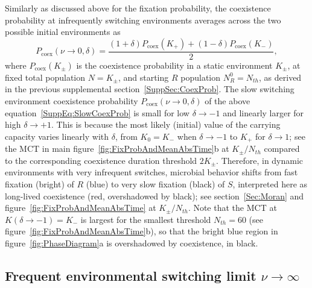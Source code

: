 \documentclass{article}
\begin{document}
Similarly as discussed above for the fixation probability, the coexistence probability at infrequently switching environments averages across the two possible initial environments as
\begin{equation}
    P_{\text{coex}}\left(\nu\rightarrow0,\delta\right) =\frac{(1+\delta)P_{\text{coex}}\left(K_+\right)+(1-\delta)P_{\text{coex}}\left(K_-\right)}{2},
\label{SuppEq:SlowCoexProb}
\end{equation}
where \(P_{\text{coex}}(K_{\pm})\) is the coexistence probability in a static environment \(K_{\pm}\), at fixed total population \(N=K_{\pm}\), and starting $R$ population \(N_R^0=N_{th}\), as derived in the previous supplemental section~\ref{SuppSec:CoexProb}. The slow switching environment coexistence probability \(P_{\text{coex}}\left(\nu\rightarrow0,\delta\right)\) of the above equation~\eqref{SuppEq:SlowCoexProb} is small for low \(\delta\rightarrow -1\) and linearly larger for high \(\delta\rightarrow +1\). This is because the most likely (initial) value of the carrying capacity varies linearly with $\delta$, from  \(K_{0}=K_{-}\) when $\delta\to -1$ to  \(K_{+}\) for $\delta\to 1$; see the MCT in main figure~\ref{fig:FixProbAndMeanAbsTime}b at \(K_{\pm}/N_{th}\) compared to the corresponding coexistence duration threshold \(2K_{\pm}\). Therefore, in dynamic environments with very infrequent switches, microbial behavior shifts from fast fixation (bright) of $R$ (blue) to very slow fixation (black) of $S$, interpreted here as long-lived coexistence (red, overshadowed by black); see section~\ref{Sec:Moran} and figure~\ref{fig:FixProbAndMeanAbsTime} at \(K_{\pm}/N_{th}\). Note that the MCT at \(K\left(\delta\rightarrow-1\right)=K_{-}\) is largest for the smallest threshold \(N_{th}=60\) (see figure~\ref{fig:FixProbAndMeanAbsTime}b), so that the bright blue region in figure~\ref{fig:PhaseDiagram}a is overshadowed by coexistence, in black.

\subsection{Frequent environmental switching limit \(\nu\rightarrow\infty\)}\label{SuppSec:FastEnv}
\end{document}
